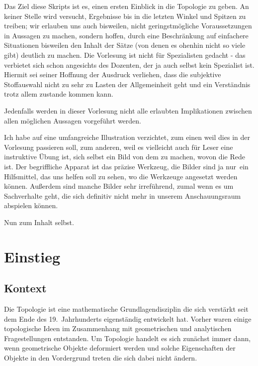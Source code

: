 \documentclass[12pt]{book}   %
\begin{document}
Das Ziel diese Skripts ist es, einen ersten Einblick in die Topologie zu geben.
An keiner Stelle wird versucht, Ergebnisse bis in die letzten Winkel und 
Spitzen zu treiben; wir erlauben uns auch bisweilen, nicht geringstm\"ogliche 
Voraussetzungen in Aussagen zu machen, sondern hoffen, durch eine 
Beschr\"ankung auf einfachere Situationen bisweilen den Inhalt der S\"atze
(von denen es ohenhin nicht so viele gibt) deutlich zu machen. Die Vorlesung
ist nicht f\"ur Spezialisten gedacht - das verbietet sich schon angesichts des
Dozenten, der ja auch selbst kein Spezialist ist. Hiermit sei seiner Hoffnung 
der Ausdruck verliehen, dass die subjektive Stoffauswahl nicht zu sehr zu 
Lasten der Allgemeinheit geht und ein Verst\"andnis trotz allem zustande
kommen kann.

Jedenfalls werden in dieser Vorlesung nicht alle erlaubten Implikationen 
zwischen allen m\"oglichen Aussagen vorgef\"uhrt werden. 

Ich habe auf eine umfangreiche Illustration verzichtet, zum einen weil dies in 
der Vorlesung passieren soll, zum 
anderen, weil es vielleicht auch f\"ur Leser eine instruktive \"Ubung ist, sich
selbst ein Bild von dem zu machen, wovon die Rede ist. Der begriffliche 
Apparat ist das pr\"azise Werkzeug, die Bilder sind ja \glqq nur\grqq\ ein 
Hilfsmittel, das uns helfen soll zu sehen, wo die Werkzeuge angesetzt werden 
k\"onnen. Au\ss erdem sind manche Bilder sehr irref\"uhrend, zumal wenn es um
Sachverhalte geht, die sich definitiv nicht mehr in unserem Anschauungsraum
abspielen k\"onnen.



\bigskip

Nun zum Inhalt selbst.

\chapter{Einstieg}

\section{Kontext}




Die Topologie ist eine mathematische Grundlagendisziplin die sich verst\"arkt
seit dem Ende des 19.\ Jahrhunderts eigenst\"andig entwickelt hat. Vorher waren
einige topologische Ideen im Zusammenhang mit geometrischen und analytischen 
Fragestellungen entstanden. Um Topologie handelt es sich zun\"achst immer dann,
wenn geometrische Objekte deformiert werden und solche Eigenschaften der 
Objekte in den Vordergrund treten die sich dabei nicht \"andern. 
\end{document}

